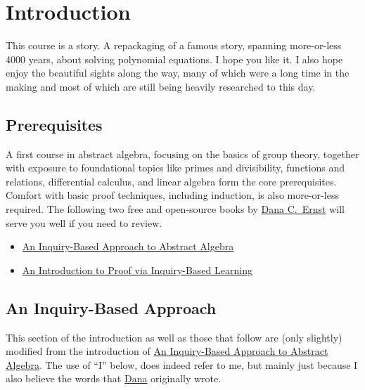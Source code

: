 \chapter{Introduction}

This course is a story. A repackaging of a famous story, spanning more-or-less 4000 years, about solving polynomial equations. I hope you like it. I also hope enjoy the beautiful sights along the way, many of which were a long time in the making and most of which are still being heavily researched to this day.

\section{Prerequisites}
A first course in abstract algebra, focusing on the basics of group theory, together with exposure to foundational topics like primes and divisibility, functions and relations, differential calculus, and linear algebra form the core prerequisites. Comfort with basic proof techniques, including induction, is also more-or-less required. The following two free and open-source books  by \href{https://danaernst.com}{Dana C.~Ernst} will serve you well if you need to review.
\begin{itemize}
\item \href{https://github.com/dcernst/IBL-AbstractAlgebra/blob/master/Fall2021/IBL-AbstractAlgebra.pdf}{An Inquiry-Based Approach to Abstract Algebra}
\item \href{https://github.com/dcernst/IBL-IntroToProof/blob/master/Fall2021/IntroToProof.pdf}{An Introduction to Proof via Inquiry-Based Learning}
\end{itemize}

\section{An Inquiry-Based Approach}
This section of the introduction as well as those that follow are (only slightly) modified from the introduction of  \href{https://github.com/dcernst/IBL-AbstractAlgebra/blob/master/Spring2018/IBL-AbstractAlgebra.pdf}{An Inquiry-Based Approach to Abstract Algebra}. The use of ``I'' below, does indeed refer to me, but mainly just because I also believe the words that \href{https://danaernst.com}{Dana} originally wrote.

